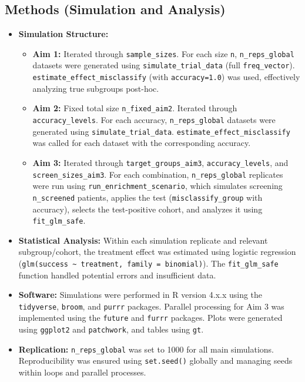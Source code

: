 \documentclass[
  letterpaper,
  DIV=11,
  numbers=noendperiod]{scrartcl}
\providecommand{\tightlist}{%
  \setlength{\itemsep}{0pt}\setlength{\parskip}{0pt}}
\begin{document}
\subsection{Methods (Simulation and
Analysis)}\label{methods-simulation-and-analysis}

\begin{itemize}
\tightlist
\item
  \textbf{Simulation Structure:}

  \begin{itemize}
  \tightlist
  \item
    \textbf{Aim 1:} Iterated through \texttt{sample\_sizes}. For each
    size \texttt{n}, \texttt{n\_reps\_global} datasets were generated
    using \texttt{simulate\_trial\_data} (full \texttt{freq\_vector}).
    \texttt{estimate\_effect\_misclassify} (with \texttt{accuracy=1.0})
    was used, effectively analyzing true subgroups post-hoc.
  \item
    \textbf{Aim 2:} Fixed total size \texttt{n\_fixed\_aim2}. Iterated
    through \texttt{accuracy\_levels}. For each accuracy,
    \texttt{n\_reps\_global} datasets were generated using
    \texttt{simulate\_trial\_data}.
    \texttt{estimate\_effect\_misclassify} was called for each dataset
    with the corresponding accuracy.
  \item
    \textbf{Aim 3:} Iterated through \texttt{target\_groups\_aim3},
    \texttt{accuracy\_levels}, and \texttt{screen\_sizes\_aim3}. For
    each combination, \texttt{n\_reps\_global} replicates were run using
    \texttt{run\_enrichment\_scenario}, which simulates screening
    \texttt{n\_screened} patients, applies the test
    (\texttt{misclassify\_group} with accuracy), selects the
    test-positive cohort, and analyzes it using \texttt{fit\_glm\_safe}.
  \end{itemize}
\item
  \textbf{Statistical Analysis:} Within each simulation replicate and
  relevant subgroup/cohort, the treatment effect was estimated using
  logistic regression
  (\texttt{glm(success\ \textasciitilde{}\ treatment,\ family\ =\ binomial)}).
  The \texttt{fit\_glm\_safe} function handled potential errors and
  insufficient data.
\item
  \textbf{Software:} Simulations were performed in R version 4.x.x using
  the \texttt{tidyverse}, \texttt{broom}, and \texttt{purrr} packages.
  Parallel processing for Aim 3 was implemented using the
  \texttt{future} and \texttt{furrr} packages. Plots were generated
  using \texttt{ggplot2} and \texttt{patchwork}, and tables using
  \texttt{gt}.
\item
  \textbf{Replication:} \texttt{n\_reps\_global} was set to 1000 for all
  main simulations. Reproducibility was ensured using
  \texttt{set.seed()} globally and managing seeds within loops and
  parallel processes.
\end{itemize}
\end{document}
